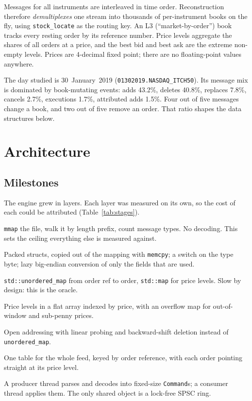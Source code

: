 \documentclass[10pt,a4paper]{article}
\newcommand{\code}[1]{\texttt{#1}}
\begin{document}
Messages for all instruments are interleaved in time order. Reconstruction therefore
\emph{demultiplexes} one stream into thousands of per-instrument books on the fly,
using \code{stock\_locate} as the routing key. An L3 (``market-by-order'') book tracks every resting order by its reference
number. Price levels aggregate the shares of all orders at a price, and the best bid and best ask
are the extreme non-empty levels. Prices are 4-decimal fixed point; there are no floating-point values anywhere.

The day studied is 30~January~2019 (\code{01302019.NASDAQ\_ITCH50}). Its message mix is dominated by book-mutating events:
adds 43.2\%, deletes 40.8\%, replaces 7.8\%, cancels 2.7\%, executions 1.7\%, attributed adds 1.5\%.
Four out of five messages change a book, and two out of five remove an order. That ratio shapes the data structures below.

\section{Architecture}
\subsection{Milestones}
The engine grew in layers. Each layer was measured on its own, so the cost of each could be attributed (Table~\ref{tab:stages}).

\begin{description}[leftmargin=1.2em, style=nextline]
  \item[M1a, framing] \code{mmap} the file, walk it by length prefix, count message types. No decoding.
        This sets the ceiling everything else is measured against.
  \item[M1b, decode] Packed structs, copied out of the mapping with \code{memcpy}; a switch on the type byte; lazy big-endian conversion of only the fields that are used.
  \item[M2, naive book] \code{std::unordered\_map} from order ref to order, \code{std::map} for price levels.
        Slow by design: this is the oracle.
  \item[M2b, price ladder] Price levels in a flat array indexed by price, with an overflow map for out-of-window and sub-penny prices.
  \item[M2c, order table] Open addressing with linear probing and backward-shift deletion instead of \code{unordered\_map}.
  \item[M2d, global order table (measured, not kept)] One table for the whole feed, keyed by order reference, with each order pointing straight at its price level.
  \item[M3, thread split] A producer thread parses and decodes into fixed-size \code{Command}s; a consumer thread
        applies them. The only shared object is a lock-free SPSC ring.
\end{description}
\end{document}
